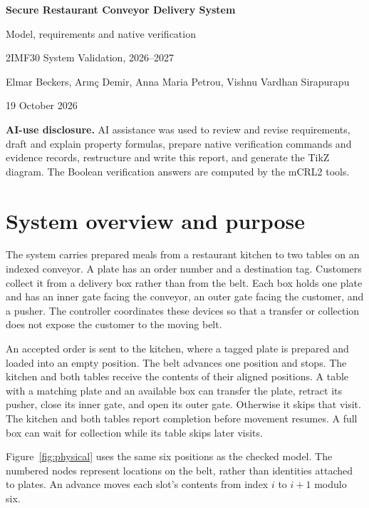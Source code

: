 \documentclass[11pt,a4paper]{article}
\newcommand{\systemname}{Secure Restaurant Conveyor Delivery System}
\newcommand{\groupmembers}{Elmar Beckers, Arınç Demir, Anna Maria Petrou, Vishnu Vardhan Sirapurapu}
\begin{document}
\begin{center}
{\Large\bfseries\color{tueblue}\systemname\par}
\vspace{0.4em}
{\large Model, requirements and native verification\par}
\vspace{0.7em}
2IMF30 System Validation, 2026--2027\par
{\small\groupmembers\par}
19 October 2026
\end{center}
{\small\textbf{AI-use disclosure.} AI assistance was used to review and revise requirements, draft and explain property formulas, prepare native verification commands and evidence records, restructure and write this report, and generate the TikZ diagram. The Boolean verification answers are computed by the mCRL2 tools.}
\tableofcontents
\clearpage

\section{System overview and purpose}
\label{sec:overview}
The system carries prepared meals from a restaurant kitchen to two tables on an indexed conveyor. A plate has an order number and a destination tag. Customers collect it from a delivery box rather than from the belt. Each box holds one plate and has an inner gate facing the conveyor, an outer gate facing the customer, and a pusher. The controller coordinates these devices so that a transfer or collection does not expose the customer to the moving belt.

An accepted order is sent to the kitchen, where a tagged plate is prepared and loaded into an empty position. The belt advances one position and stops. The kitchen and both tables receive the contents of their aligned positions. A table with a matching plate and an available box can transfer the plate, retract its pusher, close its inner gate, and open its outer gate. Otherwise it skips that visit. The kitchen and both tables report completion before movement resumes. A full box can wait for collection while its table skips later visits.

Figure~\ref{fig:physical} uses the same six positions as the checked model. The numbered nodes represent locations on the belt, rather than identities attached to plates. An advance moves each slot's contents from index $i$ to $i+1$ modulo six.
\end{document}
